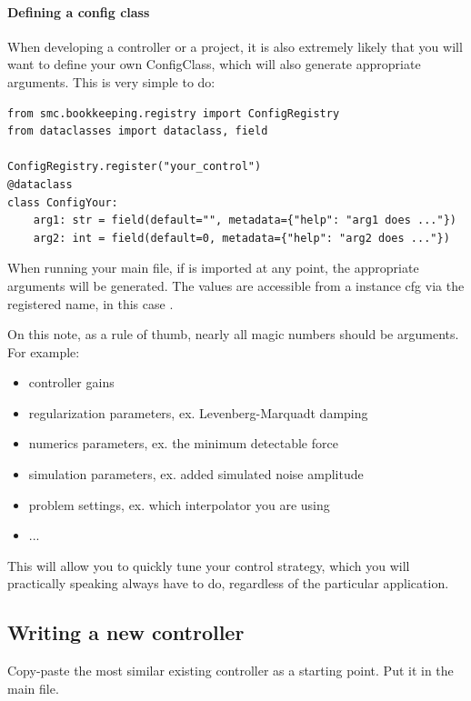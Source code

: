 \paragraph{Defining a config class}
When developing a controller or a project,
it is also extremely likely that you will want to define 
your own ConfigClass, which will also generate appropriate arguments.
This is very simple to do:
\begin{verbatim}
from smc.bookkeeping.registry import ConfigRegistry
from dataclasses import dataclass, field

ConfigRegistry.register("your_control")
@dataclass
class ConfigYour:
    arg1: str = field(default="", metadata={"help": "arg1 does ..."})
    arg2: int = field(default=0, metadata={"help": "arg2 does ..."})
\end{verbatim}
When running your main file, if  is imported
at any point, the appropriate arguments will be generated.
The values are accessible from a  instance
cfg via the registered name, in this case
.

On this note, as a rule of thumb, nearly all magic numbers 
should be arguments. For example: 
\begin{itemize}
	\item controller gains
	\item regularization parameters, ex. Levenberg-Marquadt damping
	\item numerics parameters, ex. the minimum detectable force
	\item simulation parameters, ex. added simulated noise amplitude
	\item problem settings, ex. which interpolator you are using
	\item ...
\end{itemize}
This will allow you to quickly tune your control strategy, 
which you will practically speaking always have to do,
regardless of the particular application.



\subsection{Writing a new controller}
Copy-paste the most similar existing controller as a starting point.
Put it in the main file.

